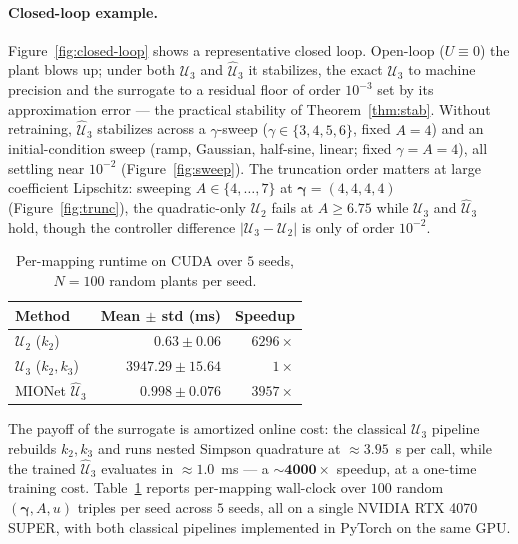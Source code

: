 \documentclass[twocolumn,amsthm]{autart}
\theoremstyle{plain}
\theoremstyle{definition}
\begin{document}
\vspace{-1.5\baselineskip}
\paragraph*{Closed-loop example.}
Figure~\ref{fig:closed-loop} shows a representative closed loop. Open-loop ($U \equiv 0$) the plant blows up; under both $\mathcal{U}_3$ and $\widehat{\mathcal{U}}_3$ it stabilizes, the exact $\mathcal{U}_3$ to machine precision and the surrogate to a residual floor of order $10^{-3}$ set by its approximation error --- the practical stability of Theorem~\ref{thm:stab}. Without retraining, $\widehat{\mathcal{U}}_3$ stabilizes across a $\gamma$-sweep ($\gamma \in \{3,4,5,6\}$, fixed $A=4$) and an initial-condition sweep (ramp, Gaussian, half-sine, linear; fixed $\gamma = A = 4$), all settling near $10^{-2}$ (Figure~\ref{fig:sweep}). The truncation order matters at large coefficient Lipschitz: sweeping $A \in \{4,\ldots,7\}$ at $\bm\gamma = (4,4,4,4)$ (Figure~\ref{fig:trunc}), the quadratic-only $\mathcal{U}_2$ fails at $A \ge 6.75$ while $\mathcal{U}_3$ and $\widehat{\mathcal{U}}_3$ hold, though the controller difference $|\mathcal{U}_3 - \mathcal{U}_2|$ is only of order $10^{-2}$.

\begin{table}[t]
  \centering
  \caption{Per-mapping runtime on CUDA over $5$ seeds, $N = 100$ random plants per seed.}
  \label{tab:runtime}
  \small
  \begin{tabular}{@{}lrr@{}}
    \toprule
    Method & Mean $\pm$ std (ms) & Speedup \\
    \midrule
    $\mathcal{U}_2$ ($k_2$)      &    $0.63 \pm 0.06$  & $6296\times$ \\
    $\mathcal{U}_3$ ($k_2,k_3$)  & $3947.29 \pm 15.64$ & $1\times$ \\
    MIONet $\widehat{\mathcal{U}}_3$ &    $0.998 \pm 0.076$ & $3957\times$ \\
    \bottomrule
  \end{tabular}
\end{table}
The payoff of the surrogate is amortized online cost: the classical $\mathcal{U}_3$ pipeline rebuilds $k_2, k_3$ and runs nested Simpson quadrature at $\approx 3.95$~s per call, while the trained $\widehat{\mathcal{U}}_3$ evaluates in $\approx 1.0$~ms --- a $\mathbf{\sim\!4000\times}$ speedup, at a one-time training cost. Table~\ref{tab:runtime} reports per-mapping wall-clock over $100$ random $(\bm\gamma, A, u)$ triples per seed across $5$ seeds, all on a single NVIDIA RTX 4070 SUPER, with both classical pipelines implemented in PyTorch on the same GPU.
\end{document}
